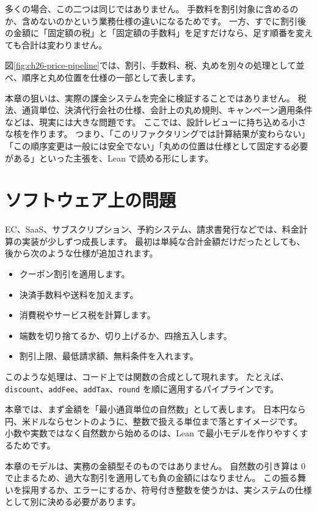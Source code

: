 多くの場合、この二つは同じではありません。
手数料を割引対象に含めるのか、含めないのかという業務仕様の違いになるためです。
一方、すでに割引後の金額に「固定額の税」と「固定額の手数料」を足すだけなら、足す順番を変えても合計は変わりません。

図\ref{fig:ch26-price-pipeline}では、割引、手数料、税、丸めを別々の処理として並べ、順序と丸め位置を仕様の一部として表します。


本章の狙いは、実際の課金システムを完全に検証することではありません。
税法、通貨単位、決済代行会社の仕様、会計上の丸め規則、キャンペーン適用条件などは、現実には大きな問題です。
ここでは、設計レビューに持ち込める小さな核を作ります。
つまり、「このリファクタリングでは計算結果が変わらない」「この順序変更は一般には安全でない」「丸めの位置は仕様として固定する必要がある」といった主張を、Lean で読める形にします。

\section{ソフトウェア上の問題}

EC、SaaS、サブスクリプション、予約システム、請求書発行などでは、料金計算の実装が少しずつ成長します。
最初は単純な合計金額だけだったとしても、後から次のような仕様が追加されます。

\begin{itemize}
\item クーポン割引を適用します。
\item 決済手数料や送料を加えます。
\item 消費税やサービス税を計算します。
\item 端数を切り捨てるか、切り上げるか、四捨五入します。
\item 割引上限、最低請求額、無料条件を入れます。
\end{itemize}

このような処理は、コード上では関数の合成として現れます。
たとえば、\texttt{discount}、\texttt{addFee}、\texttt{addTax}、\texttt{round} を順に適用するパイプラインです。

本章では、まず金額を「最小通貨単位の自然数」として表します。
日本円なら円、米ドルならセントのように、整数で扱える単位まで落とすイメージです。
小数や実数ではなく自然数から始めるのは、Lean で最小モデルを作りやすくするためです。

本章のモデルは、実務の金額型そのものではありません。
自然数の引き算は 0 で止まるため、過大な割引を適用しても負の金額にはなりません。
この振る舞いを採用するか、エラーにするか、符号付き整数を使うかは、実システムの仕様として別に決める必要があります。

